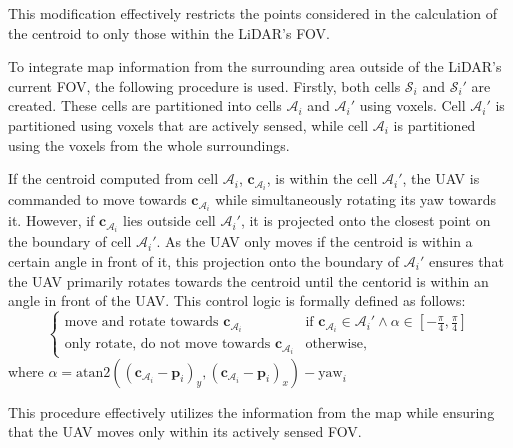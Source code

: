             This modification effectively restricts the points considered in the calculation of the centroid to only those within the \ac{LiDAR}'s \ac{FOV}.

            To integrate map information from the surrounding area outside of the \ac{LiDAR}'s current \ac{FOV}, the following procedure is used.
            Firstly, both cells $\mathcal{S}_i$ and $\mathcal{S}_i'$ are created. These cells are partitioned into cells $\mathcal{A}_i$ and $\mathcal{A}_i'$ using voxels. 
            Cell $\mathcal{A}_i'$ is partitioned using voxels that are actively sensed, while cell $\mathcal{A}_i$ is partitioned using the voxels from the whole surroundings.

            If the centroid computed from cell $\mathcal{A}_i$, $\mathbf{c}_{\mathcal{A}_i}$, is within the cell $\mathcal{A}_i'$, the \ac{UAV} is commanded to move towards $\mathbf{c}_{\mathcal{A}_i}$ while simultaneously rotating its yaw towards it.
            However, if $\mathbf{c}_{\mathcal{A}_i}$ lies outside cell $\mathcal{A}_i'$, it is projected onto the closest point on the boundary of cell $\mathcal{A}_i'$.
            As the \ac{UAV} only moves if the centroid is within a certain angle in front of it, this projection onto the boundary of $\mathcal{A}_i'$ ensures that the \ac{UAV} primarily rotates towards the centroid until the centorid is within an angle in front of the \ac{UAV}.
            This control logic is formally defined as follows:
            \begin{equation}
                \begin{cases}
                    \text{move and rotate towards } \mathbf{c}_{\mathcal{A}_i} & \text{if } \mathbf{c}_{\mathcal{A}_i} \in \mathcal{A}_i' \land \alpha \in [-\frac{\pi}{4}, \frac{\pi}{4}] \\
                    \text{only rotate, do not move towards } \mathbf{c}_{\mathcal{A}_i} & \text{otherwise, }
                \end{cases}
            \end{equation}
            where $\alpha = \text{atan2}((\mathbf{c}_{\mathcal{A}_i} - \mathbf{p}_i)_y, (\mathbf{c}_{\mathcal{A}_i} - \mathbf{p}_i)_x) - \text{yaw}_i$

            This procedure effectively utilizes the information from the map while ensuring that the \ac{UAV} moves only within its actively sensed \ac{FOV}.

